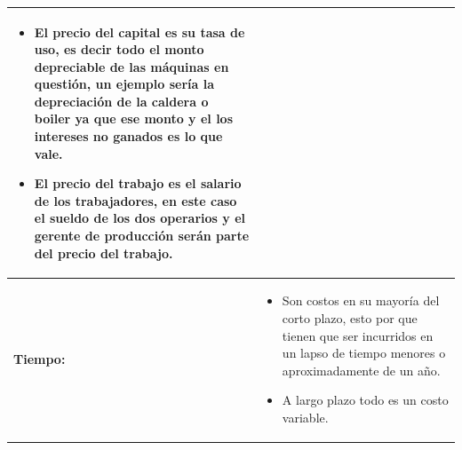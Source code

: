 \documentclass{article}
\begin{document}
\begin{center}
\begin{longtable}{ | p{4.5cm} | p{12cm} | }
            \begin{itemize}
                \item El precio del capital es su tasa de uso, es decir todo el monto depreciable de las máquinas en questión, un ejemplo sería la depreciación de la caldera o boiler ya que ese monto y el los intereses no ganados es lo que vale.
                \item El precio del trabajo es el salario de los trabajadores, en este caso el sueldo de los dos operarios y el gerente de producción serán parte del precio del trabajo.
            \end{itemize} \\ 
        \hline
            \textbf{Tiempo: } & 
            \begin{itemize}
                \item Son costos en su mayoría del corto plazo, esto por que tienen que ser incurridos en un lapso de tiempo menores o aproximadamente de un año. 
                \item A largo plazo todo es un costo variable.
            \end{itemize}  \\ 
        \hline
        
   \end{longtable}
\end{center}



\end{document}
